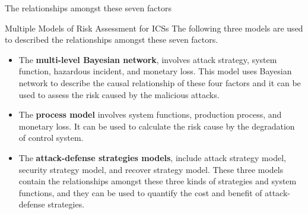 \documentclass[10pt]{beamer}
\begin{document}
\begin{frame}{The relationships amongst these seven factors}
\begin{minipage}{0.38\textwidth}
{
}
\end{minipage}
\end{frame}

\begin{frame}{Multiple Models of Risk Assessment for ICSs}
The following three models are used to described the relationships amongst these seven factors.

\begin{itemize}[<+->]
  \item The \textbf{multi-level Bayesian network}, involves attack strategy, system function, hazardous incident, and monetary loss. This model uses Bayesian network to describe the causal relationship of these four factors and it can be used to assess the risk caused by the malicious attacks.
  \item The \textbf{process model} involves system functions, production process, and monetary loss. It can be used to calculate the risk cause by the degradation of control system.
  \item The \textbf{attack-defense strategies models}, include attack strategy model, security strategy model, and recover strategy model. These three models contain the relationships amongst these three kinds of strategies and system functions, and they can be used to quantify the cost and benefit of attack-defense strategies.
\end{itemize}
\end{frame}
\end{document}
